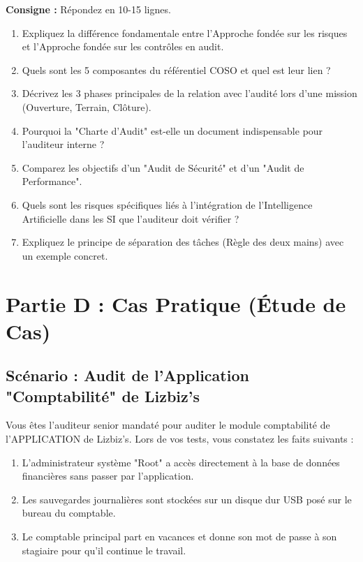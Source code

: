 \textbf{Consigne :} Répondez en 10-15 lignes.

\begin{enumerate}
    \item Expliquez la différence fondamentale entre l'Approche fondée sur les risques et l'Approche fondée sur les contrôles en audit.
    \item Quels sont les 5 composantes du référentiel COSO et quel est leur lien ?
    \item Décrivez les 3 phases principales de la relation avec l'audité lors d'une mission (Ouverture, Terrain, Clôture).
    \item Pourquoi la "Charte d'Audit" est-elle un document indispensable pour l'auditeur interne ?
    \item Comparez les objectifs d'un "Audit de Sécurité" et d'un "Audit de Performance".
    \item Quels sont les risques spécifiques liés à l'intégration de l'Intelligence Artificielle dans les SI que l'auditeur doit vérifier ?
    \item Expliquez le principe de séparation des tâches (Règle des deux mains) avec un exemple concret.
\end{enumerate}

\section{Partie D : Cas Pratique (Étude de Cas)}

\subsection{Scénario : Audit de l'Application "Comptabilité" de Lizbiz's}

\begin{displayquote}
Vous êtes l'auditeur senior mandaté pour auditer le module comptabilité de l'APPLICATION de Lizbiz's.
Lors de vos tests, vous constatez les faits suivants :
\begin{enumerate}
    \item L'administrateur système "Root" a accès directement à la base de données financières sans passer par l'application.
    \item Les sauvegardes journalières sont stockées sur un disque dur USB posé sur le bureau du comptable.
    \item Le comptable principal part en vacances et donne son mot de passe à son stagiaire pour qu'il continue le travail.
\end{enumerate}
\end{displayquote}

